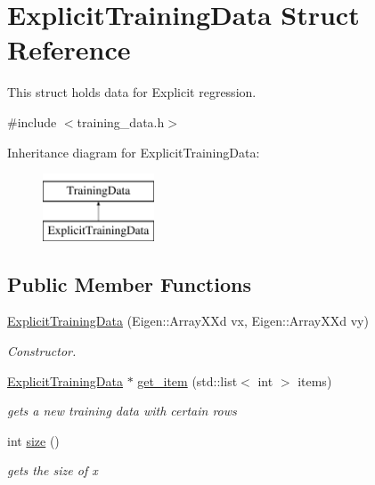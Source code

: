 \hypertarget{structExplicitTrainingData}{}\section{Explicit\+Training\+Data Struct Reference}
\label{structExplicitTrainingData}


This struct holds data for Explicit regression.  




{\ttfamily \#include $<$training\+\_\+data.\+h$>$}

Inheritance diagram for Explicit\+Training\+Data\+:\begin{figure}[H]
\begin{center}
\leavevmode
\includegraphics[height=2.000000cm]{structExplicitTrainingData}
\end{center}
\end{figure}
\subsection*{Public Member Functions}
\begin{DoxyCompactItemize}
\item 
\hyperlink{structExplicitTrainingData_a96eb847c22542ecc3f60201d36935e39}{Explicit\+Training\+Data} (Eigen\+::\+Array\+X\+Xd vx, Eigen\+::\+Array\+X\+Xd vy)\hypertarget{structExplicitTrainingData_a96eb847c22542ecc3f60201d36935e39}{}\label{structExplicitTrainingData_a96eb847c22542ecc3f60201d36935e39}

\begin{DoxyCompactList}\small\item\em Constructor. \end{DoxyCompactList}\item 
\hyperlink{structExplicitTrainingData}{Explicit\+Training\+Data} $\ast$ \hyperlink{structExplicitTrainingData_a7c60c1b5ea185580a5842c5cca18c7d0}{get\+\_\+item} (std\+::list$<$ int $>$ items)
\begin{DoxyCompactList}\small\item\em gets a new training data with certain rows \end{DoxyCompactList}\item 
int \hyperlink{structExplicitTrainingData_aa5a3da99babf2436bdb9b4652a217584}{size} ()
\begin{DoxyCompactList}\small\item\em gets the size of x \end{DoxyCompactList}\end{DoxyCompactItemize}

